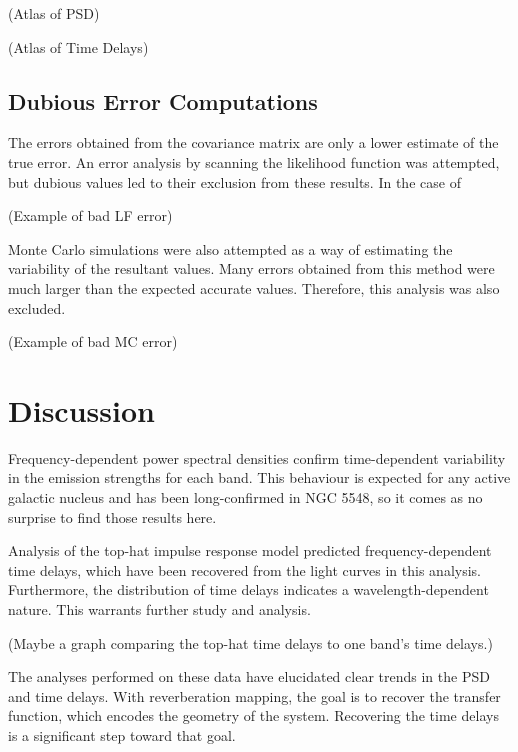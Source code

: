 \documentclass[a4paper,fleqn,usenatbib]{article}
\begin{document}
	(Atlas of PSD)

	(Atlas of Time Delays)

	\subsection{Dubious Error Computations}
	The errors obtained from the covariance matrix are only a lower estimate
	of the true error. An error analysis by scanning the likelihood function
	was attempted, but dubious values led to their exclusion from these results.
	In the case of

	(Example of bad LF error)

	Monte Carlo simulations were also attempted as a way of estimating the
	variability of the resultant values. Many errors obtained from this method
	were much larger than the expected accurate values. Therefore, this analysis
	was also excluded.

	(Example of bad MC error)


\section{Discussion}
Frequency-dependent power spectral densities confirm time-dependent variability
in the emission strengths for each band. This behaviour is expected for
any active galactic nucleus and has been long-confirmed in NGC 5548, so
it comes as no surprise to find those results here. 

Analysis of the top-hat impulse response model predicted frequency-dependent
time delays, which have been recovered from the light curves in this analysis.
Furthermore, the distribution of time delays indicates a wavelength-dependent
nature. This warrants further study and analysis.

(Maybe a graph comparing the top-hat time delays to one band's time delays.)

The analyses performed on these data have elucidated clear trends in the PSD
and time delays. With reverberation mapping, the goal is to recover the transfer
function, which encodes the geometry of the system. Recovering the time delays
is a significant step toward that goal. 





\end{document}
